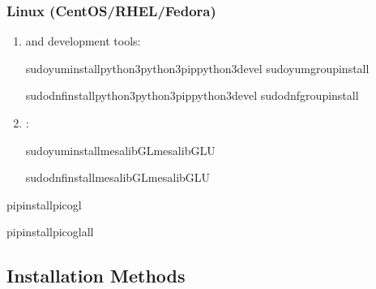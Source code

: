 \documentclass[a4paper,10pt,english,openany,oneside]{sphinxmanual}
\begin{document}
\subsubsection{Linux (CentOS/RHEL/Fedora)}
\label{\detokenize{installation:linux-centos-rhel-fedora}}\begin{enumerate}
%
\item {} 
\sphinxAtStartPar
{} and development tools:

\begin{sphinxVerbatim}[commandchars=\\\{\}]
sudoyuminstallpython3python3\PYGZhy{}pippython3\PYGZhy{}devel
sudoyumgroupinstall

sudodnfinstallpython3python3\PYGZhy{}pippython3\PYGZhy{}devel
sudodnfgroupinstall
\end{sphinxVerbatim}

\item {} 
\sphinxAtStartPar
{}:

\begin{sphinxVerbatim}[commandchars=\\\{\}]
sudoyuminstallmesa\PYGZhy{}libGLmesa\PYGZhy{}libGLU

sudodnfinstallmesa\PYGZhy{}libGLmesa\PYGZhy{}libGLU
\end{sphinxVerbatim}

\end{enumerate}

\begin{sphinxVerbatim}[commandchars=\\\{\}]
pipinstallpicogl

pipinstallpicogl\PYG{o}{[}all\PYG{o}{]}
\end{sphinxVerbatim}


\subsection{Installation Methods}
\label{\detokenize{installation:installation-methods}}
\end{document}
